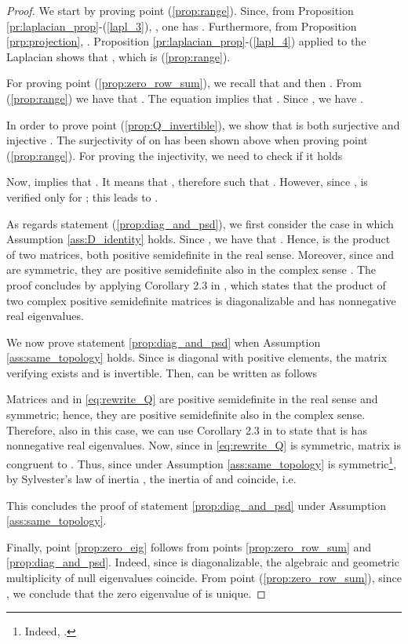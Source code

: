 \documentclass[a4paper]{article}
\theoremstyle{plain}
\begin{document}
\begin{proof}
	We start by proving point (\ref{prop:range}). Since, from Proposition \ref{pr:laplacian_prop}-(\ref{lapl_3}), , one has . Furthermore, from Proposition \ref{prp:projection}, . Proposition \ref{pr:laplacian_prop}-(\ref{lapl_4}) applied to the Laplacian  shows that , which is (\ref{prop:range}).
	
	For proving point (\ref{prop:zero_row_sum}), we recall that  and then . From (\ref{prop:range}) we have that . The equation  implies that . Since , we have .
	
	In order to prove point (\ref{prop:Q_invertible}), we  show that  is both surjective and injective \cite[p.~50]{lang1987linear}. The surjectivity of  on  has been shown above when proving point (\ref{prop:range}). For proving the injectivity, we need to check if it holds
	
	Now,  implies that . It means that , therefore  such that . However, since ,  is verified only for ; this leads to . 
	
	As regards statement (\ref{prop:diag_and_psd}), we first consider the case in which Assumption \ref{ass:D_identity} holds. Since , we have that . Hence,  is the product of two matrices, both positive semidefinite in the real sense. Moreover, since  and  are symmetric, they are positive semidefinite also in the complex sense
		\cite{pease1965methods}. The proof concludes by applying Corollary 2.3 in \cite{hong1991jordan}, which states that the product of two complex positive
		semidefinite matrices is diagonalizable and has nonnegative real
		eigenvalues. 
	
We now prove statement \eqref{prop:diag_and_psd} when Assumption \ref{ass:same_topology} holds. Since  is diagonal with positive elements, the matrix  verifying  exists and is invertible. Then,  can be written as follows
		
		Matrices  and  in \eqref{eq:rewrite_Q} are positive semidefinite in the real sense and symmetric; hence, they are positive semidefinite also in the complex sense. Therefore, also in this case, we can use Corollary 2.3 in \cite{hong1991jordan} to state that   is has nonnegative real eigenvalues. Now, since  in \eqref{eq:rewrite_Q} is symmetric, matrix  is congruent to . Thus, since under Assumption \ref{ass:same_topology}  is symmetric\footnote{Indeed, .}, by Sylvester's law of inertia \cite{horn2012matrix}, the inertia of  and  coincide, i.e.
		 
		This concludes the proof of statement \eqref{prop:diag_and_psd} under Assumption \ref{ass:same_topology}.
		
		Finally, point \eqref{prop:zero_eig} follows from points \eqref{prop:zero_row_sum} and \eqref{prop:diag_and_psd}. Indeed, since  is diagonalizable, the algebraic and geometric multiplicity of null eigenvalues coincide. From point (\ref{prop:zero_row_sum}), since , we conclude that the zero eigenvalue of  is unique.
\end{proof}
\end{document}
